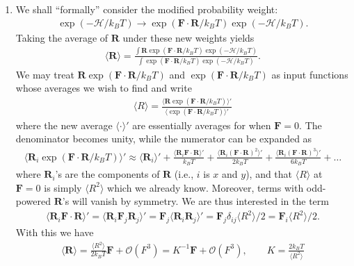 \documentclass{article}
\theoremstyle{definition}
\newcommand{\ham}{\mathcal{H}}
\newcommand{\f}[2]{\frac{#1}{#2}}
\begin{document}
\begin{enumerate}[label=(\alph*)]
	\item We shall ``formally'' consider the modified probability weight: 
	\begin{align*}
	\exp(-\ham /k_BT) \to \exp(\mathbf{F}\cdot \mathbf{R} /k_BT) \exp(-\ham /k_BT).
	\end{align*} 
	Taking the average of $\mathbf{R}$ under these new weights yields
	\begin{align*}
	\langle \mathbf{R} \rangle = \f{\int \mathbf{R} \exp(\mathbf{F}\cdot \mathbf{R} /k_BT) \exp(-\ham /k_BT) }{\int \exp(\mathbf{F}\cdot \mathbf{R} /k_BT) \exp(-\ham /k_BT)}.
	\end{align*}
	We may treat $\mathbf{R}\exp(\mathbf{F}\cdot\mathbf{R}/k_BT)$ and $\exp(\mathbf{F}\cdot \mathbf{R}/k_BT)$ as input functions whose averages we wish to find and write
	\begin{align*}
	\langle R \rangle = \f{\langle \mathbf{R} \exp(\mathbf{F}\cdot \mathbf{R}/k_BT) \rangle' }{\langle \exp(\mathbf{F}\cdot \mathbf{R}/k_BT) \rangle' }
	\end{align*}
	where the new average $\langle \cdot \rangle'$ are essentially averages for when $\mathbf{F} = 0$. The denominator becomes unity, while the numerator can be expanded as
	\begin{align*}
	\langle \mathbf{R}_i \exp(\mathbf{F}\cdot \mathbf{R}/k_BT)\rangle' \approx \langle \mathbf{R}_i \rangle' 
	+ \f{\langle \mathbf{R}_i \mathbf{F}\cdot \mathbf{R}\rangle'}{k_BT} + \f{\langle \mathbf{R}_i (\mathbf{F}\cdot \mathbf{R})^2 \rangle' }{2k_BT} + \f{\langle \mathbf{R}_i(\mathbf{F}\cdot \mathbf{R})^3\rangle'}{6k_BT} + \dots 
	\end{align*}
	where $\mathbf{R}_i$'s are the components of $\mathbf{R}$ (i.e., $i$ is $x$ and $y$), and that $\langle R \rangle$ at $\mathbf{F} =0$ is simply $\langle R^2\rangle$ which we already know. Moreover, terms with odd-powered $\mathbf{R}$'s will vanish by symmetry. We are thus interested in the term 
	\begin{align*}
	\langle \mathbf{R}_i \mathbf{F}\cdot \mathbf{R}\rangle' = \langle \mathbf{R}_i \mathbf{F}_j \mathbf{R}_j\rangle' = \mathbf{F}_j \langle \mathbf{R}_i \mathbf{R}_j \rangle' = \mathbf{F}_j \delta_{ij} \langle R^2 \rangle /2 = \mathbf{F}_i \langle R^2 \rangle/2.
	\end{align*}
	With this we have
	\begin{align*}
	\boxed{\langle \mathbf{R} \rangle = \f{\langle R^2 \rangle}{2k_BT} \mathbf{F} + \mathcal{O}(F^3) = K^{-1} \mathbf{F} + \mathcal{O}(F^3) , \quad\quad K = \f{2k_B T}{\langle R^2 \rangle}}
	\end{align*}
\end{enumerate}
\end{document}
